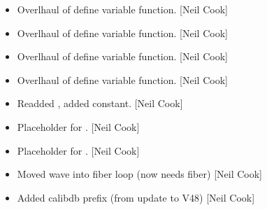 \documentclass[a4paper,10pt,english]{report}
\begin{document}
\begin{itemize}
\item {} 
Overlhaul of define variable function. {[}Neil Cook{]}

\item {} 
Overlhaul of define variable function. {[}Neil Cook{]}

\item {} 
Overlhaul of define variable function. {[}Neil Cook{]}

\item {} 
Overlhaul of define variable function. {[}Neil Cook{]}

\item {} 
Readded , added  constant. {[}Neil Cook{]}

\item {} 
Placeholder for . {[}Neil Cook{]}

\item {} 
Placeholder for . {[}Neil Cook{]}

\item {} 
Moved wave into fiber loop (now needs fiber) {[}Neil Cook{]}

\item {} 
Added calibdb prefix (from update to V48) {[}Neil Cook{]}

\end{itemize}
\end{document}
